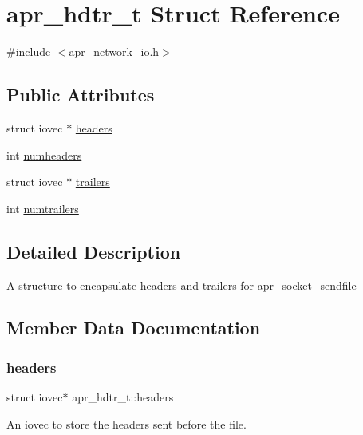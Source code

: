 \hypertarget{structapr__hdtr__t}{}\section{apr\+\_\+hdtr\+\_\+t Struct Reference}
\label{structapr__hdtr__t}


{\ttfamily \#include $<$apr\+\_\+network\+\_\+io.\+h$>$}

\subsection*{Public Attributes}
\begin{DoxyCompactItemize}
\item 
struct iovec $\ast$ \mbox{\hyperlink{structapr__hdtr__t_afc2035a3ef314f9aa6ae3aabe7c0dc72}{headers}}
\item 
int \mbox{\hyperlink{structapr__hdtr__t_a8915ade68ef06f4d23005ec0f81e9305}{numheaders}}
\item 
struct iovec $\ast$ \mbox{\hyperlink{structapr__hdtr__t_a538387cfa0065abc2bfa6ba7393fa3ee}{trailers}}
\item 
int \mbox{\hyperlink{structapr__hdtr__t_a9468659de891a5672b0b84cf442e9c7b}{numtrailers}}
\end{DoxyCompactItemize}


\subsection{Detailed Description}
A structure to encapsulate headers and trailers for apr\+\_\+socket\+\_\+sendfile 

\subsection{Member Data Documentation}
\mbox{\label{structapr__hdtr__t_afc2035a3ef314f9aa6ae3aabe7c0dc72}} 
\subsubsection{\texorpdfstring{headers}{headers}}
{\footnotesize\ttfamily struct iovec$\ast$ apr\+\_\+hdtr\+\_\+t\+::headers}

An iovec to store the headers sent before the file. \mbox{\label{structapr__hdtr__t_a8915ade68ef06f4d23005ec0f81e9305}} 
